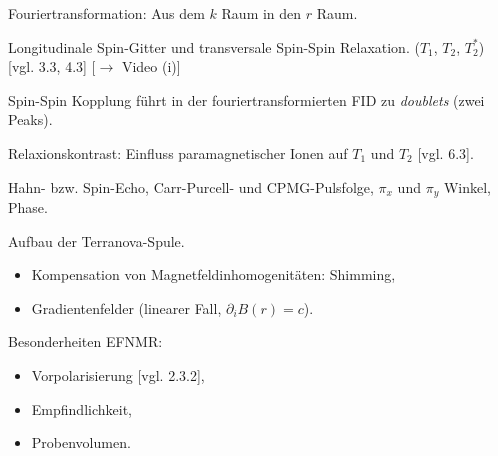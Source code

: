 \documentclass{subfiles}
\begin{document}
    \begin{Frage}
        Fouriertransformation: Aus dem $k$ Raum in den $r$ Raum. 
    \end{Frage}
    \begin{Antwort}
        
    \end{Antwort}

    \begin{Frage}
        Longitudinale Spin-Gitter und transversale Spin-Spin Relaxation. ($T_1$, $T_2$, $T_2^*$) [vgl. 3.3, 4.3] [$\to$ Video (i)]
    \end{Frage}
    \begin{Antwort}
        

        Spin-Spin Kopplung führt in der fouriertransformierten FID zu \emph{doublets} (zwei Peaks). 
    \end{Antwort}

    \begin{Frage}
        Relaxionskontrast: Einfluss paramagnetischer Ionen auf $T_1$ und $T_2$ [vgl. 6.3].
    \end{Frage}
    \begin{Antwort}
        
    \end{Antwort}

    \begin{Frage}
        Hahn- bzw. Spin-Echo, Carr-Purcell- und CPMG-Pulsfolge, $\pi_x$ und $\pi_y$ Winkel, Phase.
    \end{Frage}
    \begin{Antwort}
        
    \end{Antwort}

    \begin{Frage}
        Aufbau der Terranova-Spule.
        \begin{itemize}[label=$\to$]
            \item Kompensation von Magnetfeldinhomogenitäten: Shimming,
            \item Gradientenfelder (linearer Fall, $\partial_i B(r) = c$).
        \end{itemize}
    \end{Frage}
    \begin{Antwort}
        
    \end{Antwort}

    \begin{Frage}
        Besonderheiten EFNMR:
        \begin{itemize}[label=$\to$]
            \item Vorpolarisierung [vgl. 2.3.2],
            \item Empfindlichkeit,
            \item Probenvolumen.
        \end{itemize}
    \end{Frage}
    \begin{Antwort}
        
    \end{Antwort}
\end{document}
